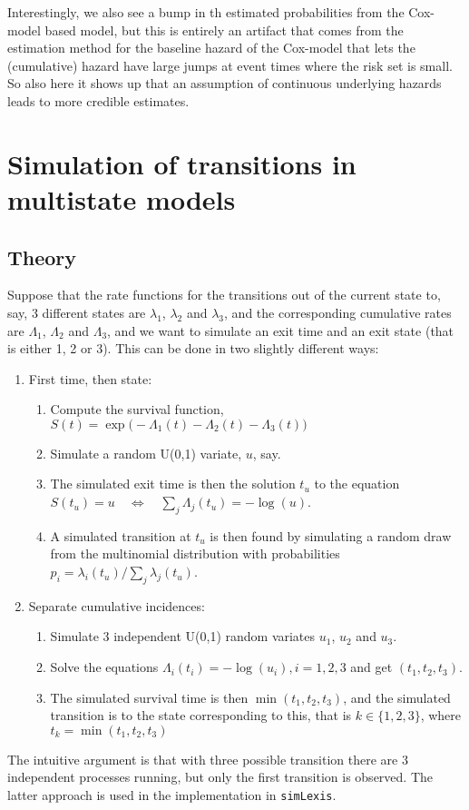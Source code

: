 \documentclass[a4paper,twoside,12pt]{report}
\begin{document}
Interestingly, we also see a bump in th estimated probabilities from
the Cox-model based model, but this is entirely an artifact that comes
from the estimation method for the baseline hazard of the Cox-model
that lets the (cumulative) hazard have large jumps at event times
where the risk set is small. So also here it shows up that an
assumption of continuous underlying hazards leads to more credible
estimates.

\chapter{Simulation of transitions in multistate models}

\section{Theory}

Suppose that the rate functions for the transitions out of the current
state to, say, 3 different states are $\lambda_1$, $\lambda_2$ and
$\lambda_3$, and the corresponding cumulative rates are $\Lambda_1$,
$\Lambda_2$ and $\Lambda_3$, and we want to simulate an exit time and
an exit state (that is either 1, 2 or 3). This can be done in two
slightly different ways:
\begin{enumerate}
\item First time, then state:
  \begin{enumerate}
  \item Compute the survival function, $S(t) =
    \exp\bigl(-\Lambda_1(t)-\Lambda_2(t)-\Lambda_3(t)\bigr)$
  \item Simulate a random U(0,1) variate, $u$, say.
  \item The simulated exit time is then the solution $t_u$ to
    the equation $S(t_u) = u \quad \Leftrightarrow \quad \sum_j\Lambda_j(t_u) = -\log(u)$.
  \item A simulated transition at $t_u$ is then found by simulating a
    random draw from the multinomial distribution with probabilities
    $p_i=\lambda_i(t_u) / \sum_j\lambda_j(t_u)$.
  \end{enumerate}
\item Separate cumulative incidences:
  \begin{enumerate}
  \item Simulate 3 independent U(0,1) random variates $u_1$, $u_2$ and $u_3$.
  \item Solve the equations $\Lambda_i(t_i)=-\log(u_i), i=1,2,3$ and get $(t_1,t_2,t_3)$.
  \item The simulated survival time is then $\min(t_1,t_2,t_3)$, and
    the simulated transition is to the state corresponding to this,
    that is $k \in \{1,2,3\}$, where $t_k=\min(t_1,t_2,t_3)$
  \end{enumerate}
\end{enumerate}
The intuitive argument is that with three possible transition there are
3 independent processes running, but only the first transition is observed.
The latter approach is used in the implementation in \texttt{simLexis}.
\end{document}

